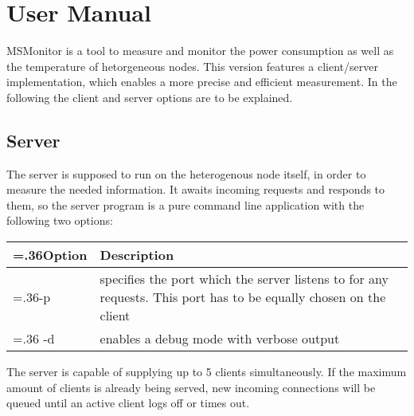 %
%
%
%
%
%

\section{User Manual}\label{sec:UserManual}
MSMonitor is a tool to measure and monitor the power consumption as well as the temperature of hetorgeneous nodes. This version features a client/server implementation, which enables a more precise and efficient measurement.
In the following the client and server options are to be explained. 

\subsection{Server}
The server is supposed to run on the heterogenous node itself, in order to measure the needed information. It awaits incoming requests and responds to them, so the server program is a pure command line application with the following two options:\newline
\begin{center}
	\begin{tabularx}{.9\textwidth}{|>{\hsize=.36\textwidth}X|X|}
		\hline
		\textbf{Option} & \textbf{Description} \\ \hline
		-p & specifies the port which the server listens to for any requests. This port has to be equally chosen on the client\\ \hline
		-d & enables a debug mode with verbose output\\ \hline
	\end{tabularx}
\end{center}
The server is capable of supplying up to 5 clients simultaneously. If the maximum amount of clients is already being served, new incoming connections will be queued until an active client logs off or times out.

